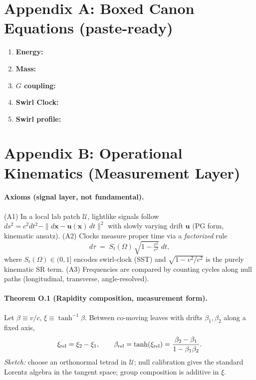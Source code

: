 \documentclass[11pt]{article}
\begin{document}
    \section*{Appendix A: Boxed Canon Equations (paste-ready)}
    \begin{enumerate}
        \item \textbf{Energy:} 
        \item \textbf{Mass:} 
        \item \textbf{$G$ coupling:} 
        \item \textbf{Swirl Clock:} 
        \item \textbf{Swirl profile:} 
    \end{enumerate}



\section*{Appendix B: Operational Kinematics (Measurement Layer)}

		\paragraph{Axioms (signal layer, not fundamental).}
		(A1) In a local lab patch $\mathcal U$, lightlike signals follow $ds^2 = c^2 dt^2 - \|d\mathbf x - \mathbf u(\mathbf x)\,dt\|^2$
		with slowly varying drift $\mathbf u$ (PG form, kinematic ansatz).
		(A2) Clocks measure proper time via a \emph{factorized} rule
		\[
			d\tau \;=\; S_t(\Omega)\,\sqrt{1-\tfrac{v^2}{c^2}}\;dt,
		\]
		where $S_t(\Omega)\in(0,1]$ encodes swirl-clock (SST) and $\sqrt{1-v^2/c^2}$ is the purely kinematic SR term.
		(A3) Frequencies are compared by counting cycles along null paths (longitudinal, transverse, angle-resolved).

		\paragraph{Theorem O.1 (Rapidity composition, measurement form).}
		Let $\beta \equiv v/c$, $\xi \equiv \tanh^{-1}\!\beta$. Between co-moving leaves with drifts $\beta_1,\beta_2$ along a fixed axis,
		\[
			\xi_{\rm rel}=\xi_2-\xi_1,
			\qquad
			\beta_{\rm rel}=\tanh(\xi_{\rm rel})=\frac{\beta_2-\beta_1}{1-\beta_1\beta_2}.
		\]
		\emph{Sketch:} choose an orthonormal tetrad in $\mathcal U$; null calibration gives the standard Lorentz algebra in the tangent space; group composition is additive in $\xi$.
\end{document}
